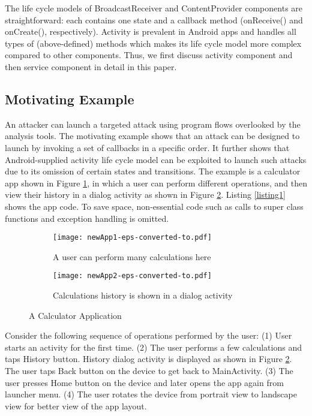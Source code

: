 \documentclass[10pt]{elsarticle}
\begin{document}
The life cycle models of BroadcastReceiver and ContentProvider components are straightforward: each contains one state and a callback method ({\ttfamily onReceive()} and {\ttfamily onCreate()}, respectively). Activity is prevalent in Android apps and handles all types of (above-defined) methods which makes its life cycle model more complex compared to other components. Thus, we first discuss activity component and then service component in detail in this paper.




\subsection {Motivating Example}

An attacker can launch a targeted attack using program flows overlooked by the analysis tools. The motivating example shows that an attack can be designed to launch by invoking a set of callbacks in a specific order. It further shows that Android-supplied activity life cycle model can be exploited to launch such attacks due to its omission of certain states and transitions. The example is a calculator app shown in Figure \ref{fig:calc}, in which a user can perform different operations, and then view their history in a dialog activity as shown in Figure \ref{fig:hist}. Listing \ref{listing1} shows the app code. To save space, non-essential code such as calls to super class functions and exception handling is omitted. 


\begin{figure}[ht]
\centering
\begin{subfigure}{.5\textwidth}
  \centering
  \texttt{[image: newApp1-eps-converted-to.pdf]}
  \scriptsize
  \caption{A user can perform many calculations here}
  \label{fig:calc}
\end{subfigure}\begin{subfigure}{.5\textwidth}
  \centering
  \texttt{[image: newApp2-eps-converted-to.pdf]}
  \caption{Calculations history is shown in a dialog activity}
   \label{fig:hist}
\end{subfigure}
\caption{A Calculator Application}
\label{motivatingExample}
\end{figure}




Consider the following sequence of operations performed by the user: (1) User starts an activity for the first time. (2) The user performs a few calculations and taps History button. History dialog activity is displayed as shown in Figure \ref{fig:hist}. The user taps Back button on the device to get back to {\ttfamily MainActivity}. (3) The user presses Home button on the device and later opens the app again from launcher menu. (4) The user rotates the device from portrait view to landscape view for better view of the app layout. 
\end{document}
